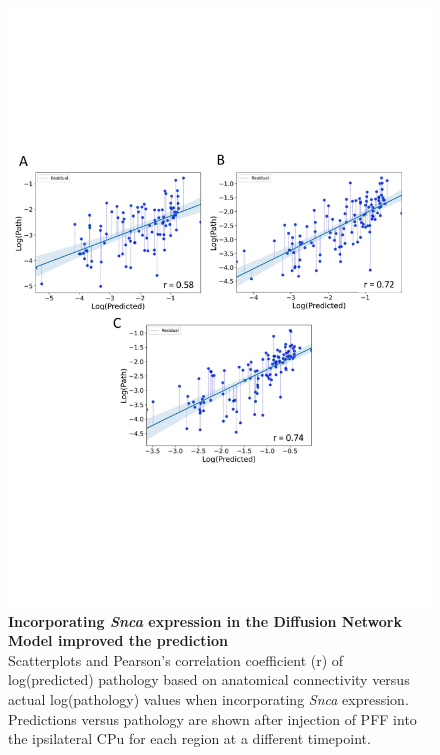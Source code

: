 \begin{figure}
    \includegraphics[width=\linewidth]{Figures/Fig3.pdf}
    \centering
    \caption{\textbf{Incorporating \textit{Snca} expression in the Diffusion Network Model improved the prediction} \\
    Scatterplots and Pearson's correlation coefficient (r) of log(predicted) pathology based on anatomical connectivity versus actual log(pathology) values when incorporating \textit{Snca} expression. Predictions versus pathology are shown after injection of PFF into the ipsilateral CPu for each region at a different timepoint.}
    \label{fig:fig3}

    \end{figure}

